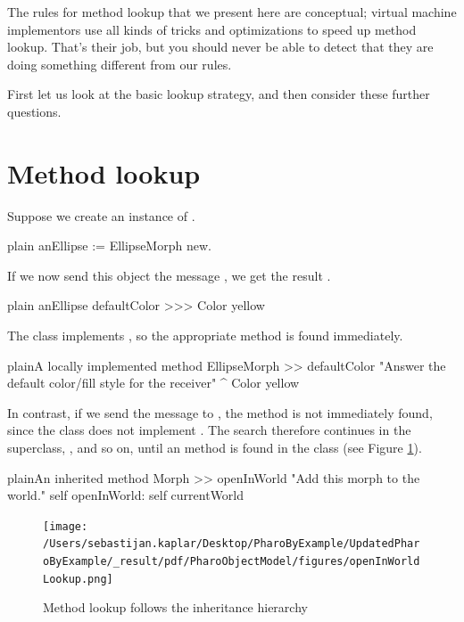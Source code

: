 \documentclass[10pt,twoside,english]{_support/latex/sbabook/sbabook}
\begin{document}
The rules for method lookup that we present here are conceptual; virtual machine
implementors use all kinds of tricks and optimizations to speed up method
lookup. That's their job, but you should never be able to detect that they are
doing something different from our rules.

First let us look at the basic lookup strategy, and then consider these further
questions.
\section{Method lookup}
Suppose we create an instance of .

\begin{displaycode}{plain}
anEllipse := EllipseMorph new.
\end{displaycode}

If we now send this object the message , we get the result
.

\begin{displaycode}{plain}
anEllipse defaultColor
>>> Color yellow
\end{displaycode}

The class  implements , so the appropriate
method is found immediately.

\begin{listing}[float, label=scr:defaultColor]{plain}{A locally implemented method}
EllipseMorph >> defaultColor
     "Answer the default color/fill style for the receiver"
     ^ Color yellow
\end{listing}

In contrast, if we send the message  to , the method
is not immediately found, since the class  does not implement
. The search therefore continues in the superclass,
, and so on, until an  method is found in the
class  (see Figure \ref{fig:openInWorldLookup}).

\begin{listing}[float, label=scr:openInWorld]{plain}{An inherited method}
Morph >> openInWorld
     "Add this morph to the world."
     self openInWorld: self currentWorld
\end{listing}


\begin{figure}

\begin{center}
\texttt{[image: /Users/sebastijan.kaplar/Desktop/PharoByExample/UpdatedPharoByExample/\_result/pdf/PharoObjectModel/figures/openInWorldLookup.png]}\caption{Method lookup follows the inheritance hierarchy\label{fig:openInWorldLookup}}\end{center}
\end{figure}
\end{document}
